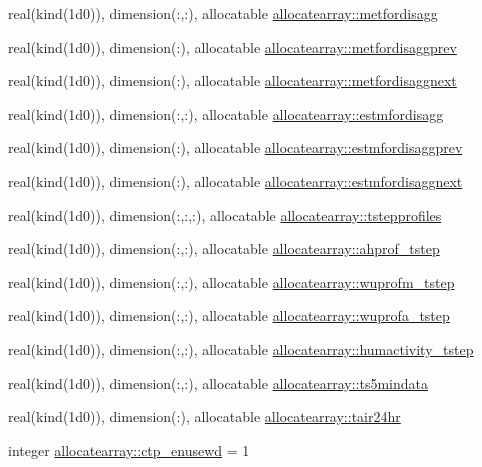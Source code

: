 \begin{DoxyCompactItemize}
real(kind(1d0)), dimension(\+:,\+:), allocatable \hyperlink{namespaceallocatearray_ae588d006cad6ab7a599dc52e5b1c1a53}{allocatearray\+::metfordisagg}
\item 
real(kind(1d0)), dimension(\+:), allocatable \hyperlink{namespaceallocatearray_a6bed79ef5fd9afaa05e43813c8bdee75}{allocatearray\+::metfordisaggprev}
\item 
real(kind(1d0)), dimension(\+:), allocatable \hyperlink{namespaceallocatearray_a4b44069fec13b7332a28f5fc6958a273}{allocatearray\+::metfordisaggnext}
\item 
real(kind(1d0)), dimension(\+:,\+:), allocatable \hyperlink{namespaceallocatearray_a04e38e0bbfe4006aeadc08af89caa7be}{allocatearray\+::estmfordisagg}
\item 
real(kind(1d0)), dimension(\+:), allocatable \hyperlink{namespaceallocatearray_a394a7e4ca5cd90520c9f11e395eaa1c5}{allocatearray\+::estmfordisaggprev}
\item 
real(kind(1d0)), dimension(\+:), allocatable \hyperlink{namespaceallocatearray_ab6944a9a020ecb9ba0d067278abfcf85}{allocatearray\+::estmfordisaggnext}
\item 
real(kind(1d0)), dimension(\+:,\+:,\+:), allocatable \hyperlink{namespaceallocatearray_a55a6f7a4814f569e03bd6f5fd947f6b2}{allocatearray\+::tstepprofiles}
\item 
real(kind(1d0)), dimension(\+:,\+:), allocatable \hyperlink{namespaceallocatearray_af89bfe5fa1931abd777949bfe250cbd8}{allocatearray\+::ahprof\+\_\+tstep}
\item 
real(kind(1d0)), dimension(\+:,\+:), allocatable \hyperlink{namespaceallocatearray_adb237729df78f011f8ea814ee43f1703}{allocatearray\+::wuprofm\+\_\+tstep}
\item 
real(kind(1d0)), dimension(\+:,\+:), allocatable \hyperlink{namespaceallocatearray_ab6f942b1808c9a62a4628cbd9e7e34a1}{allocatearray\+::wuprofa\+\_\+tstep}
\item 
real(kind(1d0)), dimension(\+:,\+:), allocatable \hyperlink{namespaceallocatearray_ae27c6668e2bfb798c38cf0e347949fde}{allocatearray\+::humactivity\+\_\+tstep}
\item 
real(kind(1d0)), dimension(\+:,\+:), allocatable \hyperlink{namespaceallocatearray_a79aa4fab4188b3e6b7a24b64220153e2}{allocatearray\+::ts5mindata}
\item 
real(kind(1d0)), dimension(\+:), allocatable \hyperlink{namespaceallocatearray_a763b6159cb62d3d9bdba9505d8729007}{allocatearray\+::tair24hr}
\item 
integer \hyperlink{namespaceallocatearray_aab05a44c46e86871314b22e0ef8b7cd8}{allocatearray\+::ctp\+\_\+enusewd} = 1

\end{DoxyCompactItemize}
